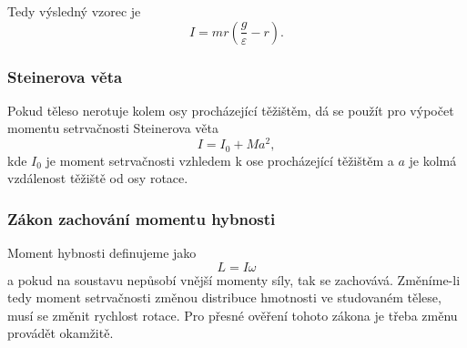 \documentclass[english]{article}
\begin{document}
Tedy výsledný vzorec je
\begin{equation}\label{eq:moment_setrvacnosti_final}
I = m r ( \frac{g}{\varepsilon} - r ).
\end{equation}

\subsubsection{Steinerova věta}

Pokud těleso nerotuje kolem osy procházející těžištěm, dá se použít pro výpočet momentu setrvačnosti Steinerova věta
\begin{equation}\label{eq:steinerova_veta}
I = I_0 + Ma^2,
\end{equation}
kde $I_0$ je moment setrvačnosti vzhledem k ose procházející těžištěm a $a$ je kolmá vzdálenost těžiště od osy rotace.

\subsubsection{Zákon zachování momentu hybnosti}
Moment hybnosti definujeme jako
\begin{equation}\label{eq:moment_hybnosti_final}
L = I \omega
\end{equation}
a pokud na soustavu nepůsobí vnější momenty síly, tak se zachovává. Změníme-li tedy moment setrvačnosti změnou distribuce hmotnosti ve studovaném tělese, musí se změnit rychlost rotace. Pro přesné ověření tohoto zákona je třeba změnu provádět okamžitě.
\end{document}
